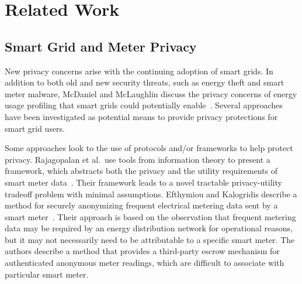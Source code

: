 \section{Related Work}
\label{sec:related}

\subsection{Smart Grid and Meter Privacy}





New privacy concerns arise with the continuing adoption of smart grids. In addition to both old and new security threats, such as energy theft and smart meter malware, McDaniel and McLaughlin discuss the privacy concerns of energy usage profiling that smart grids could potentially enable~\cite{mcdaniel2009security}. Several approaches have been investigated as potential means to provide privacy protections for smart grid users.

Some approaches look to the use of protocols and/or frameworks to help protect privacy. Rajagopalan et al.\ use tools from information theory to present a framework, which abstracts both the privacy and the utility requirements of smart meter data~\cite{rajagopalan2011smart,sankar2013smart}. Their framework leads to a novel tractable privacy-utility tradeoff problem with minimal assumptions. Efthymiou and Kalogridis describe a method for securely anonymizing frequent electrical metering data sent by a smart meter~\cite{efthymiou2010smart}. Their approach is based on the observation that frequent metering data may be required by an energy distribution network for operational reasons, but it may not necessarily need to be attributable to a specific smart meter. The authors describe a method that provides a third-party escrow mechanism for authenticated anonymous meter readings, which are difficult to associate with particular smart meter.

